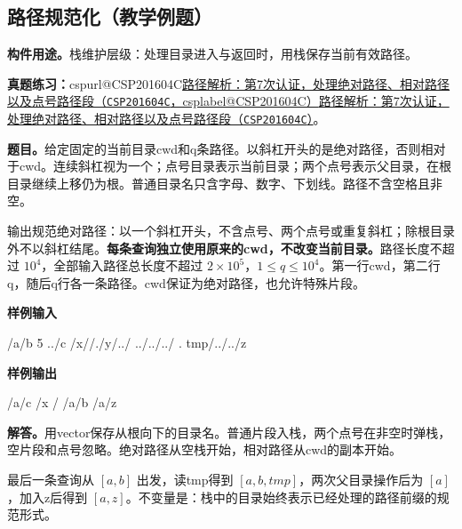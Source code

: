 \documentclass[UTF8,11pt,a4paper,fontset=none]{ctexart}
\makeatletter
\newcommand{\csp}[2]{\ifcsname cspurl@#1\endcsname\href{\csname cspurl@#1\endcsname}{#2（\texttt{#1}，\csname csplabel@#1\endcsname）}\else\href{https://oj.shumeng.tech/p/#1}{#2（\texttt{#1}）}\fi}
\newcommand{\ojpractice}[2]{\par\noindent\textbf{真题练习：}\csp{#1}{#2}。\par}
\makeatother
\begin{document}
\subsection{路径规范化（教学例题）}
\noindent\textbf{构件用途。}栈维护层级：处理目录进入与返回时，用栈保存当前有效路径。

\ojpractice{CSP201604C}{路径解析：第7次认证，处理绝对路径、相对路径以及点号路径段}

\noindent\textbf{题目。}给定固定的当前目录cwd和q条路径。以斜杠开头的是绝对路径，否则相对于cwd。连续斜杠视为一个；点号目录表示当前目录；两个点号表示父目录，在根目录继续上移仍为根。普通目录名只含字母、数字、下划线。路径不含空格且非空。

输出规范绝对路径：以一个斜杠开头，不含点号、两个点号或重复斜杠；除根目录外不以斜杠结尾。\textbf{每条查询独立使用原来的cwd，不改变当前目录。}路径长度不超过 $10^4$，全部输入路径总长度不超过 $2\times10^5$，$1\le q\le10^4$。第一行cwd，第二行q，随后q行各一条路径。cwd保证为绝对路径，也允许特殊片段。
\begin{tcolorbox}[samplebox,title={输入输出样例}]
\textbf{样例输入}
\begin{Sample}
/a/b
5
../c
/x//./y/../
../../../
.
tmp/../../z
\end{Sample}
\tcblower
\textbf{样例输出}
\begin{Sample}
/a/c
/x
/
/a/b
/a/z
\end{Sample}
\end{tcolorbox}

\noindent\textbf{解答。}用vector保存从根向下的目录名。普通片段入栈，两个点号在非空时弹栈，空片段和点号忽略。绝对路径从空栈开始，相对路径从cwd的副本开始。

最后一条查询从 $[a,b]$ 出发，读tmp得到 $[a,b,tmp]$，两次父目录操作后为 $[a]$，加入z后得到 $[a,z]$。不变量是：栈中的目录始终表示已经处理的路径前缀的规范形式。
\end{document}
